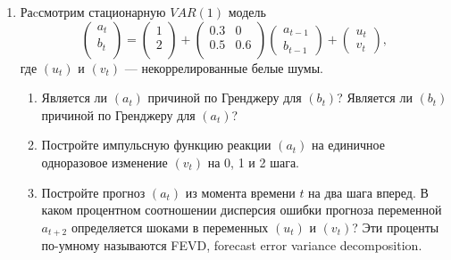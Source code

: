 \documentclass[12pt]{article}
\begin{document}

\begin{enumerate}

\item Раcсмотрим стационарную $VAR(1)$ модель
\[
\begin{pmatrix}
    a_t \\
    b_t \\
\end{pmatrix}  =
\begin{pmatrix}
    1 \\
    2 \\
\end{pmatrix} + 
\begin{pmatrix}
    0.3 & 0 \\
    0.5 & 0.6 \\
\end{pmatrix}
\begin{pmatrix}
    a_{t-1} \\
    b_{t-1}
\end{pmatrix} +
\begin{pmatrix}
    u_t \\
    v_t
\end{pmatrix},
\]
где $(u_t)$ и $(v_t)$ — некоррелированные белые шумы. 

\begin{enumerate}
    \item Является ли $(a_t)$ причиной по Гренджеру для $(b_t)$? Является ли $(b_t)$ причиной по Гренджеру для $(a_t)$?
    \item Постройте импульсную функцию реакции $(a_t)$ на единичное одноразовое изменение $(v_t)$ на 0, 1 и 2 шага. 
    \item Постройте прогноз $(a_t)$ из момента времени $t$ на два шага вперед. 
    В каком процентном соотношении дисперсия ошибки прогноза переменной $a_{t+2}$
    определяется шоками в переменных $(u_t)$ и $(v_t)$? 
    Эти проценты по-умному называются FEVD, forecast error variance decomposition. 
\end{enumerate}



\end{enumerate}
\end{document}
